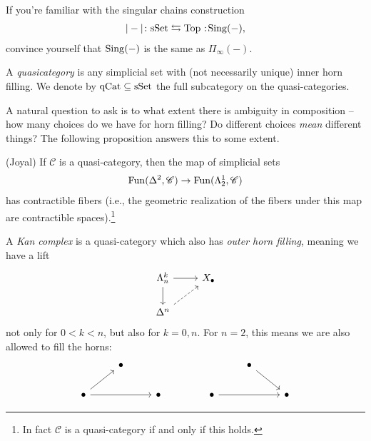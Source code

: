 \documentclass[11pt]{amsart}
\begin{document}
\begin{exercise} If you're familiar with the singular chains construction
\begin{align*}
    |-| \colon \sSet \leftrightarrows \Top \noloc \Sing(-),
\end{align*}
convince yourself that $\mathrm{Sing}(-)$ is the same as $\Pi_\infty(-)$.
\end{exercise}


\begin{definition} A \textit{quasicategory} is any simplicial set with (not necessarily unique) inner horn filling. We denote by $\mathrm{qCat} \subseteq \mathrm{sSet}$ the full subcategory on the quasi-categories.
\end{definition}

A natural question to ask is to what extent there is ambiguity in composition -- how many choices do we have for horn filling? Do different choices \textit{mean} different things? The following proposition answers this to some extent.

\begin{proposition} (Joyal) If $\mathscr{C}$ is a quasi-category, then the map of simplicial sets
\begin{align*}
    \mathrm{Fun}(\Delta^2,\mathscr{C})\to \mathrm{Fun}(\Lambda_2^1,\mathscr{C})
\end{align*}
has contractible fibers (i.e., the geometric realization of the fibers under this map are contractible spaces).\footnote{In fact $\mathscr{C}$ is a quasi-category if and only if this holds.}

\end{proposition}





\begin{definition} A \textit{Kan complex} is a quasi-category which also has \textit{outer horn filling}, meaning we have a lift
\[ \begin{tikzcd}
    \Lambda^k_n\rar\dar & X_\bullet\\
    \Delta^n\ar[ur,dashed] & 
\end{tikzcd} \]
not only for $0<k<n$, but also for $k=0,n$. For $n=2$, this means we are also allowed to fill the horns:
\[ \begin{tikzcd}
     & \bullet\\
    \bullet\ar[ur]\ar[rr] & & \bullet
\end{tikzcd} \quad\quad \quad\quad  \begin{tikzcd}
    & \bullet\ar[dr] & \\
    \bullet\ar[rr] & & \bullet
\end{tikzcd} \]
\end{definition}
\end{document}
